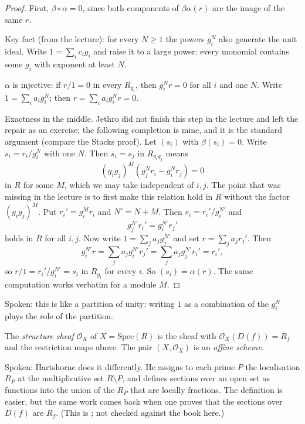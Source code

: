 \begin{proof}
First, $\beta\circ\alpha=0$, since both
components of $\beta\alpha(r)$ are the image
of the same $r$.

Key fact (from the lecture): for every
$N\geq1$ the powers $g_i^N$ also generate the
unit ideal. Write $1=\sum_i c_ig_i$ and raise
it to a large power: every monomial contains
some $g_i$ with exponent at least $N$.

$\alpha$ is injective: if $r/1=0$ in every
$R_{g_i}$, then $g_i^Nr=0$ for all $i$ and
one $N$. Write $1=\sum_i a_ig_i^N$; then
$r=\sum_i a_ig_i^Nr=0$.

Exactness in the middle. Jethro did not
finish this step in the lecture and left the
repair as an exercise; the following
completion is mine, and it is the standard
argument (compare the Stacks proof). Let
$(s_i)$ with $\beta(s_i)=0$. Write
$s_i=r_i/g_i^N$ with one $N$. Then $s_i=s_j$
in $R_{g_ig_j}$ means
$$
(g_ig_j)^M(g_j^Nr_i-g_i^Nr_j)=0
$$
in $R$ for some $M$, which we may take
independent of $i,j$. The point that was
missing in the lecture is to first make this
relation hold in $R$ without the factor
$(g_ig_j)^M$. Put $r_i'=g_i^Mr_i$ and
$N'=N+M$. Then $s_i=r_i'/g_i^{N'}$ and
$$
g_j^{N'}r_i'=g_i^{N'}r_j'
$$
holds in $R$ for all $i,j$. Now write
$1=\sum_j a_jg_j^{N'}$ and set $r=\sum_j
a_jr_j'$. Then
$$
g_i^{N'}r=\sum_j a_jg_i^{N'}r_j'
=\sum_j a_jg_j^{N'}r_i'=r_i',
$$
so $r/1=r_i'/g_i^{N'}=s_i$ in $R_{g_i}$ for
every $i$. So $(s_i)=\alpha(r)$. The same
computation works verbatim for a module $M$.
\end{proof}

Spoken: this is like a partition of unity:
writing $1$ as a combination of the $g_i^N$
plays the role of the partition.

\begin{definition}
\label{definition-structure-sheaf-jethro}
The \textit{structure sheaf} $\mathcal{O}_X$
of $X=\mathrm{Spec}(R)$ is the sheaf with
$\mathcal{O}_X(D(f))=R_f$ and the restriction
maps above. The pair $(X,\mathcal{O}_X)$ is
an \textit{affine scheme}.
\end{definition}

Spoken: Hartshorne does it differently. He
assigns to each prime $P$ the localisation
$R_P$ at the multiplicative set $R\setminus
P$, and defines sections over an open set as
functions into the union of the $R_P$ that
are locally fractions. The definition is
easier, but the same work comes back when one
proves that the sections over $D(f)$ are
$R_f$. (This is \cite[Section II.2,
Proposition 2.2]{har}; not checked against
the book
here.)

